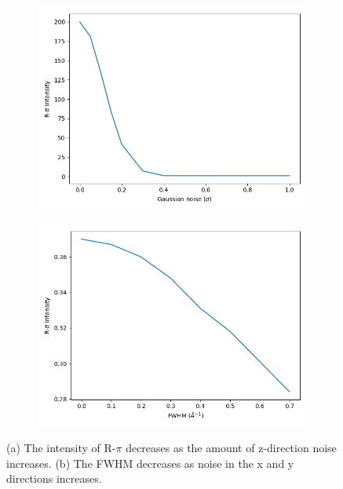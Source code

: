 \documentclass{article}
\begin{document}
  \begin{figure}[!htb]
  \centering
  \begin{subfigure}{0.45\textwidth}
  \includegraphics[width=\textwidth]{z_noise_perfect.png}
  \caption{}\label{fig:z_noise_perfect}
  \end{subfigure}
  \begin{subfigure}{0.45\textwidth}
  \includegraphics[width=\textwidth]{xy_noise_perfect.png}
  \caption{}\label{fig:xy_noise_perfect}
  \end{subfigure}
  \caption{(a) The intensity of R-$\pi$ decreases as the amount of z-direction
  noise increases. (b) The FWHM decreases as noise in the x and y directions
  increases.}\label{fig:perfect_noise}
  \end{figure}
\end{document}
